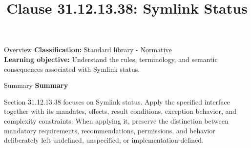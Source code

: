 \documentclass[10pt,letterpaper]{article}
\title{Clause 31.12.13.38: Symlink Status}
\author{}
\date{}
\begin{document}
\maketitle
\begin{CornellOverviewBox}{Overview}
\textbf{Classification:} Standard library - Normative\\[2pt]
\textbf{Learning objective:} Understand the rules, terminology, and semantic consequences associated with Symlink status.
\end{CornellOverviewBox}\begin{CornellSummaryBox}{Summary}
{\sffamily\bfseries\color{Accent} Summary}\par\vspace{3pt}Section 31.12.13.38 focuses on Symlink status. Apply the specified interface together with its mandates, effects, result conditions, exception behavior, and complexity constraints. When applying it, preserve the distinction between mandatory requirements, recommendations, permissions, and behavior deliberately left undefined, unspecified, or implementation-defined.
\end{CornellSummaryBox}
\end{document}

